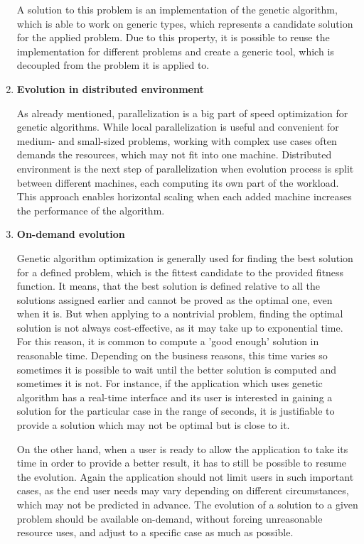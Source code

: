 \begin{enumerate}
A solution to this problem is an implementation of the genetic algorithm, which is able to work on generic types, which represents a candidate solution for the applied problem. Due to this property, it is possible to reuse the implementation for different problems and create a generic tool, which is decoupled from the problem it is applied to.
\medbreak

\item \label{freq:distributed} \textbf{Evolution in distributed environment}

As already mentioned, parallelization is a big part of speed optimization for genetic algorithms. While local parallelization is useful and convenient for medium- and small-sized problems, working with complex use cases often demands the resources, which may not fit into one machine. Distributed environment is the next step of parallelization when evolution process is split between different machines, each computing its own part of the workload. This approach enables horizontal scaling when each added machine increases the performance of the algorithm.
\medbreak

\item \label{freq:on-demand} \textbf{On-demand evolution}

Genetic algorithm optimization is generally used for finding the best solution for a defined problem, which is the fittest candidate to the provided fitness function. It means, that the best solution is defined relative to all the solutions assigned earlier and cannot be proved as the optimal one, even when it is. But when applying to a nontrivial problem, finding the optimal solution is not always cost-effective, as it may take up to exponential time. For this reason, it is common to compute a 'good enough' solution in reasonable time. Depending on the business reasons, this time varies so sometimes it is possible to wait until the better solution is computed and sometimes it is not. For instance, if the application which uses genetic algorithm has a real-time interface and its user is interested in gaining a solution for the particular case in the range of seconds, it is justifiable to provide a solution which may not be optimal but is close to it.

On the other hand, when a user is ready to allow the application to take its time in order to provide a better result, it has to still be possible to resume the evolution. Again the application should not limit users in such important cases, as the end user needs may vary depending on different circumstances, which may not be predicted in advance. The evolution of a solution to a given problem should be available on-demand, without forcing unreasonable resource uses, and adjust to a specific case as much as possible.
\medbreak
\end{enumerate}